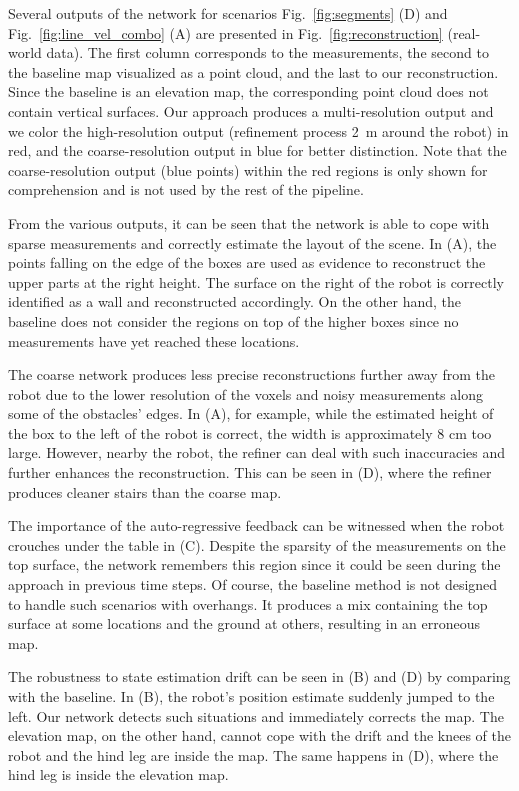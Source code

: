 \documentclass[conference]{IEEEtran}
\begin{document}
Several outputs of the network for scenarios Fig.~\ref{fig:segments} (D) and Fig.~\ref{fig:line_vel_combo} (A) are presented in Fig.~\ref{fig:reconstruction} (real-world data). The first column corresponds to the measurements, the second to the baseline map visualized as a point cloud, and the last to our reconstruction. Since the baseline is an elevation map, the corresponding point cloud does not contain vertical surfaces. Our approach produces a multi-resolution output and we color the high-resolution output (refinement process \SI{2}{\meter} around the robot) in red, and the coarse-resolution output in blue for better distinction. Note that the coarse-resolution output (blue points) within the red regions is only shown for comprehension and is not used by the rest of the pipeline.

From the various outputs, it can be seen that the network is able to cope with sparse measurements and correctly estimate the layout of the scene. In (A), the points falling on the edge of the boxes are used as evidence to reconstruct the upper parts at the right height. The surface on the right of the robot is correctly identified as a wall and reconstructed accordingly. On the other hand, the baseline does not consider the regions on top of the higher boxes since no measurements have yet reached these locations.

The coarse network produces less precise reconstructions further away from the robot due to the lower resolution of the voxels and noisy measurements along some of the obstacles' edges. In (A), for example, while the estimated height of the box to the left of the robot is correct, the width is approximately 8 cm too large. However, nearby the robot, the refiner can deal with such inaccuracies and further enhances the reconstruction. This can be seen in (D), where the refiner produces cleaner stairs than the coarse map.

The importance of the auto-regressive feedback can be witnessed when the robot crouches under the table in (C). Despite the sparsity of the measurements on the top surface, the network remembers this region since it could be seen during the approach in previous time steps. Of course, the baseline method is not designed to handle such scenarios with overhangs. It produces a mix containing the top surface at some locations and the ground at others, resulting in an erroneous map.

The robustness to state estimation drift can be seen in (B) and (D) by comparing with the baseline. In (B), the robot's position estimate suddenly jumped to the left. Our network detects such situations and immediately corrects the map. The elevation map, on the other hand, cannot cope with the drift and the knees of the robot and the hind leg are inside the map. The same happens in (D), where the hind leg is inside the elevation map.
\end{document}
